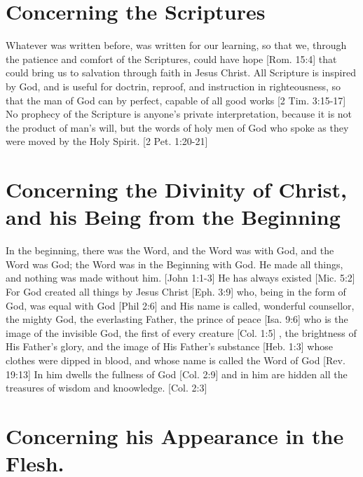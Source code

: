 \documentclass[../main.tex] {subfiles}
\begin{document}
	\section{Concerning the Scriptures}

	Whatever was written before, was written for our learning, so that we, through the patience and comfort of the Scriptures, could have hope [Rom. 15:4]  that could bring us to salvation through faith in Jesus Christ. All Scripture is inspired by God, and is useful for doctrin, reproof, and instruction in righteousness, so that the man of God can by perfect, capable of all good works [2 Tim. 3:15-17]  No prophecy of the Scripture is anyone's private interpretation, because it is not the product of man's will, but the words of holy men of God who spoke as they were moved by the Holy Spirit. [2 Pet. 1:20-21] 

	\section{Concerning the Divinity of Christ, and his Being from the Beginning}

	In the beginning, there was the Word, and the Word was with God, and the Word was God; the Word was in the Beginning with God. He made all things, and nothing was made without him. [John 1:1-3]  He has always existed [Mic. 5:2]  For God created all things by Jesus Christ [Eph. 3:9]  who, being in the form of God, was equal with God [Phil 2:6]  and His name is called, wonderful counsellor, the mighty God, the everlasting Father, the prince of peace [Isa. 9:6]  who is the image of the invisible God, the first of every creature [Col. 1:5] , the brightness of His Father's glory, and the image of His Father's substance [Heb. 1:3]  whose clothes were dipped in blood, and whose name is called the Word of God [Rev. 19:13]  In him dwells the fullness of God [Col. 2:9]  and in him are hidden all the treasures of wisdom and knoowledge. [Col. 2:3] 

	\section{Concerning his Appearance in the Flesh.}
\end{document}
